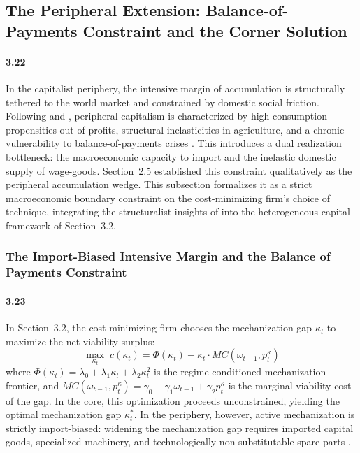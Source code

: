 \subsection{The Peripheral Extension: Balance-of-Payments
	Constraint and the Corner Solution}

\paragraph{3.22}
In the capitalist periphery, the intensive margin of
accumulation is structurally tethered to the world market and
constrained by domestic social friction. Following
\citet{Prebisch1981} and \citet{Kaldor1959}, peripheral
capitalism is characterized by high consumption propensities
out of profits, structural inelasticities in agriculture, and
a chronic vulnerability to balance-of-payments crises
\citep{Ahumada2019}. This introduces a dual realization
bottleneck: the macroeconomic capacity to import and the
inelastic domestic supply of wage-goods. Section~2.5
established this constraint qualitatively as the peripheral
accumulation wedge. This subsection formalizes it as a strict
macroeconomic boundary constraint on the cost-minimizing
firm's choice of technique, integrating the structuralist
insights of \citet{Prebisch1981} into the heterogeneous
capital framework of Section~3.2.

\subsubsection{The Import-Biased Intensive Margin and the
	Balance of Payments Constraint}

\paragraph{3.23}
In Section~3.2, the cost-minimizing firm chooses the
mechanization gap $\kappa_t$ to maximize the net viability
surplus:
\begin{equation}
	\max_{\kappa_t}\; c(\kappa_t)
	= \Phi(\kappa_t) - \kappa_t \cdot MC(\omega_{t-1}, p^\kappa_t)
	\label{eq:33:objective_periphery}
\end{equation}
where $\Phi(\kappa_t) = \lambda_0 + \lambda_1 \kappa_t
+ \lambda_2 \kappa_t^2$ is the regime-conditioned
mechanization frontier, and $MC(\omega_{t-1}, p^\kappa_t)
= \gamma_0 - \gamma_1 \omega_{t-1} + \gamma_2 p^\kappa_t$
is the marginal viability cost of the gap. In the core, this
optimization proceeds unconstrained, yielding the optimal
mechanization gap $\kappa_t^*$. In the periphery, however,
active mechanization is strictly import-biased: widening the
mechanization gap requires imported capital goods, specialized
machinery, and technologically non-substitutable spare parts \citep{Vernengo2006}.

